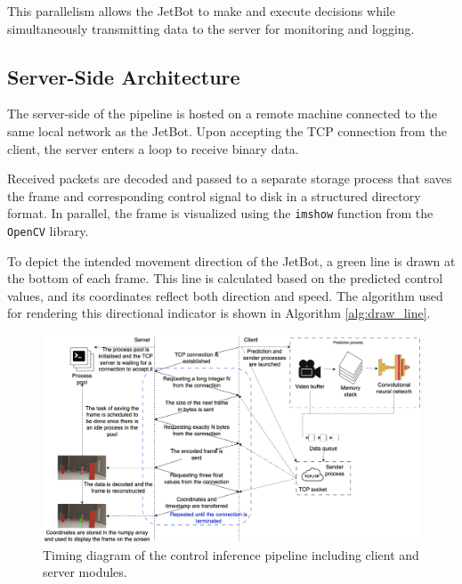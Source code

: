 This parallelism allows the JetBot to make and execute decisions while simultaneously transmitting data to the server for monitoring and logging.

\subsection{Server-Side Architecture}

The server-side of the pipeline is hosted on a remote machine connected to the same local network as the JetBot. Upon accepting the TCP connection from the client, the server enters a loop to receive binary data.

Received packets are decoded and passed to a separate storage process that saves the frame and corresponding control signal to disk in a structured directory format. In parallel, the frame is visualized using the \texttt{imshow} function from the \texttt{OpenCV} library.

To depict the intended movement direction of the JetBot, a green line is drawn at the bottom of each frame. This line is calculated based on the predicted control values, and its coordinates reflect both direction and speed. The algorithm used for rendering this directional indicator is shown in Algorithm \ref{alg:draw_line}.

\begin{figure}[H]
  \centering
  \includegraphics[width=1.0\linewidth]{Images/control_inference_pipeline.png}
  \caption{Timing diagram of the control inference pipeline including client and server modules.}
  \label{fig:pipeline}
\end{figure}


